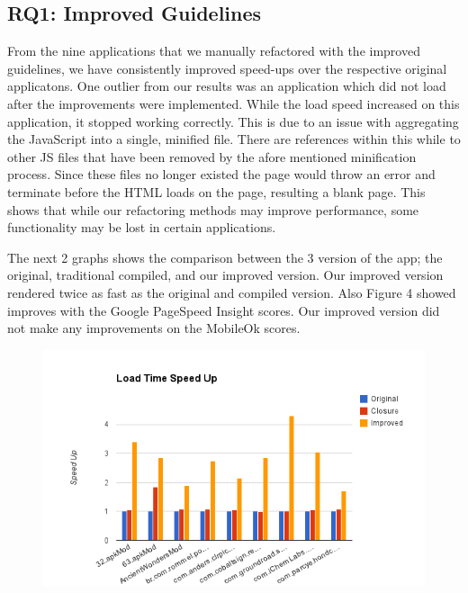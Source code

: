\documentclass{acm_proc_article-sp}
\begin{document}
\subsection{RQ1: Improved Guidelines}
From the nine applications that we manually refactored with the improved guidelines, we have consistently improved speed-ups over the respective original applicatons.
One outlier from our results was an application which did not load after the improvements were implemented.
While the load speed increased on this application, it stopped working correctly.
This is due to an issue with aggregating the JavaScript into a single, minified file.
There are references within this while to other JS files that have been removed by the afore mentioned minification process.
Since these files no longer existed the page would throw an error and terminate before the HTML loads on the page, resulting a blank page.
This shows that while our refactoring methods may improve performance, some functionality may be lost in certain applications.


The next 2 graphs shows the comparison between the 3 version of the app; the original, traditional compiled, and our improved version. Our improved version rendered twice as fast as the original and compiled version. Also Figure 4 showed improves with the Google PageSpeed Insight scores. Our improved version did not make any improvements on the MobileOk scores. 
\begin{figure}[h!]
    \includegraphics[scale=0.4]{loadtime}
\end{figure}
\end{document}
